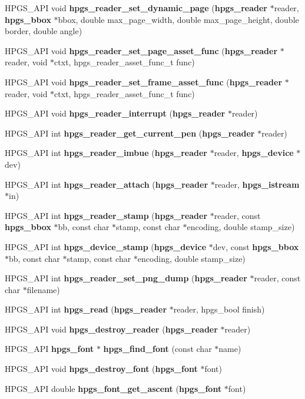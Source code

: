 \begin{CompactItemize}
\item 
HPGS\_\-API void {\bf hpgs\_\-reader\_\-set\_\-dynamic\_\-page} ({\bf hpgs\_\-reader} $\ast$reader, {\bf hpgs\_\-bbox} $\ast$bbox, double max\_\-page\_\-width, double max\_\-page\_\-height, double border, double angle)
\item 
HPGS\_\-API void {\bf hpgs\_\-reader\_\-set\_\-page\_\-asset\_\-func} ({\bf hpgs\_\-reader} $\ast$reader, void $\ast$ctxt, hpgs\_\-reader\_\-asset\_\-func\_\-t func)
\item 
HPGS\_\-API void {\bf hpgs\_\-reader\_\-set\_\-frame\_\-asset\_\-func} ({\bf hpgs\_\-reader} $\ast$reader, void $\ast$ctxt, hpgs\_\-reader\_\-asset\_\-func\_\-t func)
\item 
HPGS\_\-API void {\bf hpgs\_\-reader\_\-interrupt} ({\bf hpgs\_\-reader} $\ast$reader)
\item 
HPGS\_\-API int {\bf hpgs\_\-reader\_\-get\_\-current\_\-pen} ({\bf hpgs\_\-reader} $\ast$reader)
\item 
HPGS\_\-API int {\bf hpgs\_\-reader\_\-imbue} ({\bf hpgs\_\-reader} $\ast$reader, {\bf hpgs\_\-device} $\ast$dev)
\item 
HPGS\_\-API int {\bf hpgs\_\-reader\_\-attach} ({\bf hpgs\_\-reader} $\ast$reader, {\bf hpgs\_\-istream} $\ast$in)
\item 
HPGS\_\-API int {\bf hpgs\_\-reader\_\-stamp} ({\bf hpgs\_\-reader} $\ast$reader, const {\bf hpgs\_\-bbox} $\ast$bb, const char $\ast$stamp, const char $\ast$encoding, double stamp\_\-size)
\item 
HPGS\_\-API int {\bf hpgs\_\-device\_\-stamp} ({\bf hpgs\_\-device} $\ast$dev, const {\bf hpgs\_\-bbox} $\ast$bb, const char $\ast$stamp, const char $\ast$encoding, double stamp\_\-size)
\item 
HPGS\_\-API int {\bf hpgs\_\-reader\_\-set\_\-png\_\-dump} ({\bf hpgs\_\-reader} $\ast$reader, const char $\ast$filename)
\item 
HPGS\_\-API int {\bf hpgs\_\-read} ({\bf hpgs\_\-reader} $\ast$reader, hpgs\_\-bool finish)
\item 
HPGS\_\-API void {\bf hpgs\_\-destroy\_\-reader} ({\bf hpgs\_\-reader} $\ast$reader)
\item 
HPGS\_\-API {\bf hpgs\_\-font} $\ast$ {\bf hpgs\_\-find\_\-font} (const char $\ast$name)
\item 
HPGS\_\-API void {\bf hpgs\_\-destroy\_\-font} ({\bf hpgs\_\-font} $\ast$font)
\item 
HPGS\_\-API double {\bf hpgs\_\-font\_\-get\_\-ascent} ({\bf hpgs\_\-font} $\ast$font)

\end{CompactItemize}
